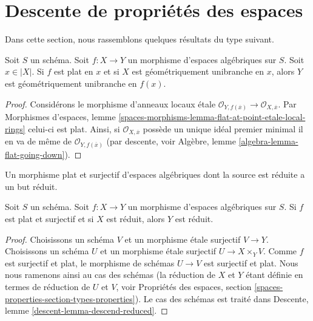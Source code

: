 \section{Descente de propriétés des espaces}
\label{section-descending-properties-spaces}

\noindent
Dans cette section, nous rassemblons quelques résultats du type suivant.

\begin{lemma}
\label{lemma-descend-unibranch}
Soit $S$ un schéma.
Soit $f : X \to Y$ un morphisme d'espaces algébriques sur $S$.
Soit $x \in |X|$.
Si $f$ est plat en $x$ et si $X$ est géométriquement unibranche en $x$, alors $Y$ est
géométriquement unibranche en $f(x)$.
\end{lemma}

\begin{proof}
Considérons le morphisme d'anneaux locaux \'etale
$\mathcal{O}_{Y, f(\overline{x})} \to \mathcal{O}_{X, \overline{x}}$.
Par
Morphismes d'espaces, lemme
\ref{spaces-morphisms-lemma-flat-at-point-etale-local-rings}
celui-ci est plat. Ainsi, si $\mathcal{O}_{X, \overline{x}}$ possède un unique idéal premier minimal
il en va de même de $\mathcal{O}_{Y, f(\overline{x})}$ (par descente, voir
Algèbre, lemme \ref{algebra-lemma-flat-going-down}).
\end{proof}

\begin{lemma}
\label{lemma-descend-reduced}
\begin{slogan}
Un morphisme plat et surjectif d'espaces algébriques dont la source est réduite
a un but réduit.
\end{slogan}
Soit $S$ un schéma.
Soit $f : X \to Y$ un morphisme d'espaces algébriques sur $S$.
Si $f$ est plat et surjectif et si $X$ est réduit, alors $Y$ est réduit.
\end{lemma}

\begin{proof}
Choisissons un schéma $V$ et un morphisme \'etale surjectif $V \to Y$.
Choisissons un schéma $U$ et un morphisme \'etale surjectif
$U \to X \times_Y V$. Comme $f$ est surjectif et plat, le morphisme de
schémas $U \to V$ est surjectif et plat. Nous nous ramenons ainsi
au cas des schémas (la réduction de $X$ et $Y$ étant définie
en termes de réduction de $U$ et $V$, voir
Propriétés des espaces,
section \ref{spaces-properties-section-types-properties}).
Le cas des schémas est traité dans
Descente, lemme \ref{descent-lemma-descend-reduced}.
\end{proof}

